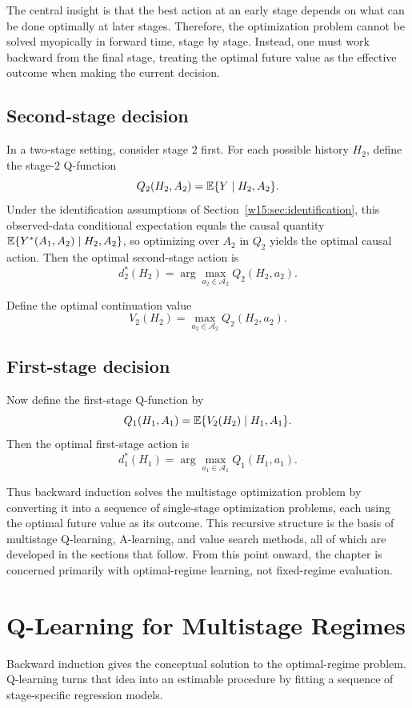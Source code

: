 \documentclass[master.tex]{subfiles}
\begin{document}
The central insight is that the best action at an early stage depends on what can be done optimally at later stages. Therefore, the optimization problem cannot be solved myopically in forward time, stage by stage. Instead, one must work backward from the final stage, treating the optimal future value as the effective outcome when making the current decision.

\subsection{Second-stage decision}

In a two-stage setting, consider stage 2 first. For each possible history $H_2$, define the stage-2 Q-function
\[
Q_2(H_2,A_2)=\mathbb{E}\{Y\mid H_2,A_2\}.
\]
Under the identification assumptions of Section~\ref{w15:sec:identification}, this observed-data conditional expectation equals the causal quantity $\mathbb{E}\{Y^*(A_1,A_2)\mid H_2, A_2\}$, so optimizing over $A_2$ in $Q_2$ yields the optimal causal action.
Then the optimal second-stage action is
\[
d_2^\ast(H_2)=\arg\max_{a_2\in\mathcal A_2} Q_2(H_2,a_2).
\]

Define the optimal continuation value
\[
V_2(H_2)=\max_{a_2\in\mathcal A_2} Q_2(H_2,a_2).
\]

\subsection{First-stage decision}

Now define the first-stage Q-function by
\[
Q_1(H_1,A_1)=\mathbb{E}\{V_2(H_2)\mid H_1,A_1\}.
\]
Then the optimal first-stage action is
\[
d_1^\ast(H_1)=\arg\max_{a_1\in\mathcal A_1} Q_1(H_1,a_1).
\]

Thus backward induction solves the multistage optimization problem by converting it into a sequence of single-stage optimization problems, each using the optimal future value as its outcome. This recursive structure is the basis of multistage Q-learning, A-learning, and value search methods, all of which are developed in the sections that follow. From this point onward, the chapter is concerned primarily with optimal-regime learning, not fixed-regime evaluation.

\section{Q-Learning for Multistage Regimes}
\label{w15:sec:qlearning}

Backward induction gives the conceptual solution to the optimal-regime problem. Q-learning turns that idea into an estimable procedure by fitting a sequence of stage-specific regression models.
\end{document}
